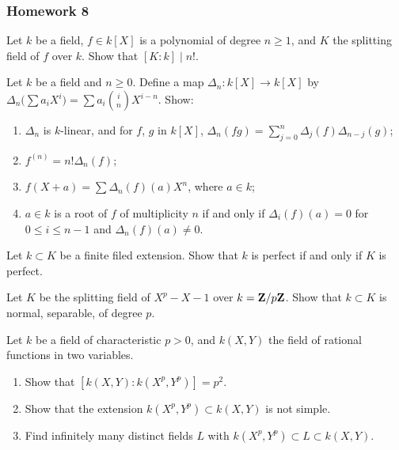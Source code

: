\subsubsection{Homework 8}
\setcounter{exercise}{0}
\setcounter{equation}{0}

\begin{problem}
  Let $k$ be a field, $f\in k[X]$ is a polynomial of degree $n\geq 1$,
  and $K$ the splitting field of $f$ over $k$. Show that
  $[K:k]\mid n!$.
\end{problem}
\begin{solution}
\end{solution}

\begin{problem}
  Let $k$ be a field and $n\geq 0$. Define a map
  $\Delta_n\colon k[X]\to k[X]$ by
  $\Delta_n\bigl(\sum a_iX^i\bigr)=\sum
  a_i\binom{i}{n}X^{i-n}$. Show:
\begin{enumerate}[label=(\alph*),noitemsep]
\item $\Delta_n$ is $k$-linear, and for $f$, $g$ in $k[X]$,
  $\Delta_n(fg)=\sum_{j=0}^n\Delta_j(f)\Delta_{n-j}(g)$;
\item $f^{(n)}=n!\Delta_n(f)$;
\item $f(X+a)=\sum\Delta_n(f)(a)X^n$, where $a\in k$;
\item $a\in k$ is a root of $f$ of multiplicity $n$ if and only if
  $\Delta_i(f)(a)=0$ for $0\leq i\leq n-1$ and $\Delta_n(f)(a)\neq 0$.
\end{enumerate}
\end{problem}
\begin{solution}
\end{solution}

\begin{problem}
  Let $k\subset K$ be a finite filed extension. Show that $k$ is
  perfect if and only if $K$ is perfect.
\end{problem}
\begin{solution}
\end{solution}

\begin{problem}
  Let $K$ be the splitting field of $X^p-X-1$ over
  $k=\mathbf{Z}/p\mathbf{Z}$. Show that $k\subset K$ is normal,
  separable, of degree $p$.
\end{problem}
\begin{solution}
\end{solution}

\begin{problem}
  Let $k$ be a field of characteristic $p>0$, and $k(X,Y)$ the field
  of rational functions in two variables.
\begin{enumerate}[label=(\alph*),noitemsep]
\item Show that $\left[k(X,Y):k(X^p,Y^p)\right]=p^2$.
\item Show that the extension $k(X^p,Y^p)\subset k(X,Y)$ is not
  simple.
\item Find infinitely many distinct fields $L$ with
  $k(X^p,Y^p)\subset L\subset k(X,Y)$.
\end{enumerate}
\end{problem}
\begin{solution}
\end{solution}

